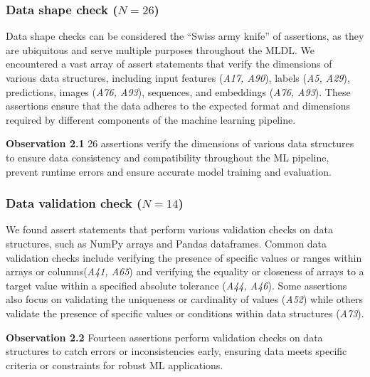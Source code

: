 \documentclass[smallextended]{svjour3}       %
\newcommand{\highlight}[1]{\begin{framed}%
  \noindent#1
\end{framed}}
\providecommand{\DIFaddbegin}{} %
\providecommand{\DIFaddend}{} %
\providecommand{\DIFdelbegin}{} %
\providecommand{\DIFdelend}{} %
\newcommand{\DIFscaledelfig}{0.5}
\newlength{\DIFdelgraphicswidth} %
\newlength{\DIFdelgraphicsheight} %
\newcommand{\DIFaddincludegraphics}[2][]{{\color{blue}\fbox{\DIFOincludegraphics[#1]{#2}}}} %
\newcommand{\DIFdelincludegraphics}[2][]{%
\sbox{\DIFdelgraphicsbox}{\DIFOincludegraphics[#1]{#2}}%
\settoboxwidth{\DIFdelgraphicswidth}{\DIFdelgraphicsbox} %
\settoboxtotalheight{\DIFdelgraphicsheight}{\DIFdelgraphicsbox} %
\scalebox{\DIFscaledelfig}{%
\parbox[b]{\DIFdelgraphicswidth}{\usebox{\DIFdelgraphicsbox}\\[-\baselineskip] \rule{\DIFdelgraphicswidth}{0em}}\llap{\resizebox{\DIFdelgraphicswidth}{\DIFdelgraphicsheight}{%
\setlength{\unitlength}{\DIFdelgraphicswidth}%
\begin{picture}(1,1)%
\thicklines\linethickness{2pt} %
{\color[rgb]{1,0,0}\put(0,0){\framebox(1,1){}}}%
{\color[rgb]{1,0,0}\put(0,0){\line( 1,1){1}}}%
{\color[rgb]{1,0,0}\put(0,1){\line(1,-1){1}}}%
\end{picture}%
}\hspace*{3pt}}} %
} %
\DeclareRobustCommand{\DIFaddbegin}{\DIFOaddbegin \let\includegraphics\DIFaddincludegraphics} %
\DeclareRobustCommand{\DIFaddend}{\DIFOaddend \let\includegraphics\DIFOincludegraphics} %
\DeclareRobustCommand{\DIFdelbegin}{\DIFOdelbegin \let\includegraphics\DIFdelincludegraphics} %
\DeclareRobustCommand{\DIFdelend}{\DIFOaddend \let\includegraphics\DIFOincludegraphics} %
\begin{document}
\subsubsection{Data shape check ($N = 26$)}

Data shape checks can be considered the ``Swiss army knife'' of assertions, as they are ubiquitous and serve multiple purposes throughout the MLDL. We encountered a vast array of assert statements that verify the dimensions of various data structures, including input features (\emph{A17, A90}), labels (\emph{A5, A29}), predictions, images (\emph{A76, A93}), sequences, and embeddings (\emph{A76, A93}). These assertions ensure that the data adheres to the expected format and dimensions required by different components of the machine learning pipeline.

\DIFdelbegin %
\DIFdelend \DIFaddbegin \highlight{\textbf{Observation 2.1} 26 assertions verify the dimensions of various data structures to ensure data consistency and compatibility throughout the ML pipeline, prevent runtime errors and ensure accurate model training and evaluation.}
\DIFaddend 

\subsubsection{Data validation check ($N = 14$)}

We found assert statements that perform various validation checks on data structures, such as NumPy arrays and Pandas dataframes. Common data validation checks include verifying the presence of specific values or ranges within arrays or columns(\emph{A41, A65}) and verifying the equality or closeness of arrays to a target value within a specified absolute tolerance (\emph{A44, A46}). Some assertions also focus on validating the uniqueness or cardinality of values (\emph{A52}) while others validate the presence of specific values or conditions within data structures (\emph{A73}).

\DIFdelbegin %
\DIFdelend \DIFaddbegin \highlight{\textbf{Observation 2.2} Fourteen assertions perform validation checks on data structures to catch errors or inconsistencies early, ensuring data meets specific criteria or constraints for robust ML applications.}
\DIFaddend 
\end{document}
